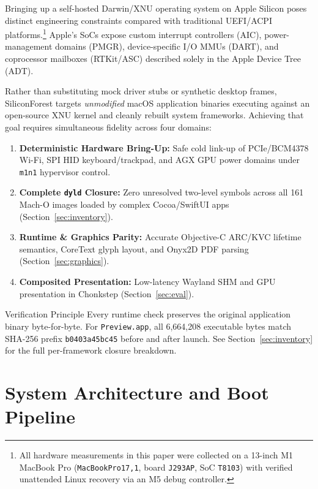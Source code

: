 \documentclass[10pt,twocolumn,letterpaper]{article}
\begin{document}
Bringing up a self-hosted Darwin/XNU operating system on Apple Silicon poses distinct engineering constraints compared with traditional UEFI/ACPI platforms.\footnote{All hardware measurements in this paper were collected on a 13-inch M1 MacBook Pro (\texttt{MacBookPro17,1}, board \texttt{J293AP}, SoC \texttt{T8103}) with verified unattended Linux recovery via an M5 debug controller.} Apple's SoCs expose custom interrupt controllers (AIC), power-management domains (PMGR), device-specific I/O MMUs (DART), and coprocessor mailboxes (RTKit/ASC) described solely in the Apple Device Tree (ADT).

Rather than substituting mock driver stubs or synthetic desktop frames, SiliconForest targets \emph{unmodified} macOS application binaries executing against an open-source XNU kernel and cleanly rebuilt system frameworks. Achieving that goal requires simultaneous fidelity across four domains:
\begin{enumerate}[leftmargin=14pt,itemsep=2pt,topsep=3pt]
  \item \textbf{Deterministic Hardware Bring-Up:} Safe cold link-up of PCIe/BCM4378 Wi-Fi, SPI HID keyboard/trackpad, and AGX GPU power domains under \texttt{m1n1} hypervisor control.
  \item \textbf{Complete \texttt{dyld} Closure:} Zero unresolved two-level symbols across all 161 Mach-O images loaded by complex Cocoa/SwiftUI apps (Section~\ref{sec:inventory}).
  \item \textbf{Runtime \& Graphics Parity:} Accurate Objective-C ARC/KVC lifetime semantics, CoreText glyph layout, and Onyx2D PDF parsing (Section~\ref{sec:graphics}).
  \item \textbf{Composited Presentation:} Low-latency Wayland SHM and GPU presentation in Chonkstep (Section~\ref{sec:eval}).
\end{enumerate}

\begin{sfnote}{Verification Principle}
Every runtime check preserves the original application binary byte-for-byte. For \texttt{Preview.app}, all 6,664,208 executable bytes match SHA-256 prefix \texttt{b0403a45bc45} before and after launch. See Section~\ref{sec:inventory} for the full per-framework closure breakdown.
\end{sfnote}

\section{System Architecture and Boot Pipeline}
\label{sec:arch}
\end{document}
